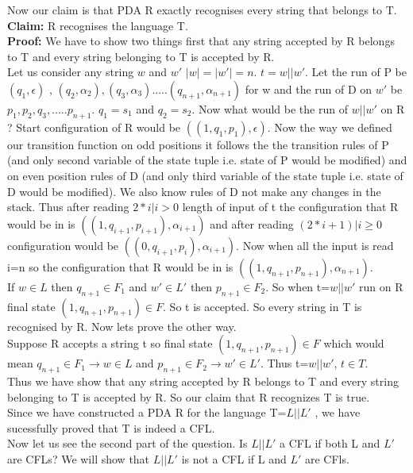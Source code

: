\documentclass{article}
\begin{document}
Now our claim is that PDA R exactly recognises every string that belongs to T. \\
\textbf{Claim:} R recognises the language T.\\
\textbf{Proof:} We have to show two things first that any string accepted by R belongs to T and every string belonging to T is accepted by R. \\
Let us consider any string $w $ and $w'$ $|w| = |w'|= n$. $t=w||w'$. Let the run of P be $(q_1,\epsilon)$ , $(q_2,\alpha_2) , (q_3,\alpha_3) .....(q_{n+1} ,\alpha_{n+1} )$ for w and the run of D on $w'$ be $p_1 , p_2 , q_3 ,.....p_{n+1} $. $q_1 = s_1$ and $q_2 =s_2$. Now what would be the run of $w || w'$ on R ? Start configuration of R would be $((1,q_1,p_1), \epsilon)$. Now the way we defined our transition function on odd positions it follows the the transition rules of P (and only second variable of the state tuple i.e. state of P would be modified)  and on even position rules of D (and only third variable of the state tuple i.e. state of D would be modified). We also know rules of D not make any changes in the stack. Thus after reading $2*i | i> 0$  length of input of t the configuration that R would be in is $((1,q_{i+1},p_{i+1}),\alpha_{i+1})$  and after reading $(2*i+1) |  i \geq 0$ configuration would be $((0,q_{i+1},p_{i}),\alpha_{i+1})$. Now when all the input is read i=n so the configuration that R would be in is $((1,q_{n+1},p_{n+1}),\alpha_{n+1})$.\\
If $w \in L$ then $q_{n+1} \in F_1$ and   $w' \in L'$ then $p_{n+1} \in F_2$. So when t=$w|| w'$ run on R final state $(1,q_{n+1},p_{n+1}) \in F$. So t is accepted. So every string in T is recognised by R. Now lets prove the other way.\\ 
Suppose R accepts a string t so final state $(1,q_{n+1},p_{n+1}) \in F$ which would mean $q_{n+1} \in F_1 \rightarrow  w \in L$ and $p_{n+1} \in F_2 \rightarrow w' \in L'$. Thus t=$w || w'$, $t \in T$. \\
Thus we have show that any string accepted by R belongs to T and every string belonging to T is accepted by R. So our claim that R recognizes T is true. \\
\newline
Since we have constructed a PDA R for the language T=$L || L'$ , we have sucessfully proved that T is indeed a CFL.
\\
\newline
Now let us see the second part of the question. Is $L||L'$ a CFL if both L and $L'$ are
CFLs? We will show that $L|| L'$ is not a CFL if L and $L'$ are CFls. \\
\end{document}
